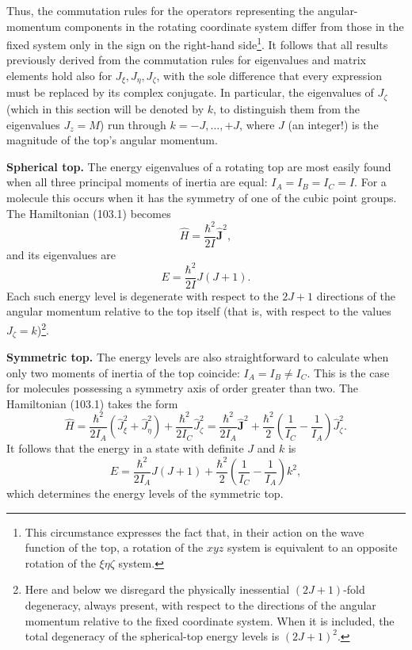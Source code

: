 Thus, the commutation rules for the operators representing the angular-momentum components in the rotating coordinate system differ from those in the fixed system only in the sign on the right-hand side\footnote{This circumstance expresses the fact that, in their action on the wave function of the top, a rotation of the $xyz$ system is equivalent to an opposite rotation of the $\xi\eta\zeta$ system.}. It follows that all results previously derived from the commutation rules for eigenvalues and matrix elements hold also for $J_\xi,J_\eta,J_\zeta$, with the sole difference that every expression must be replaced by its complex conjugate. In particular, the eigenvalues of $J_\zeta$ (which in this section will be denoted by $k$, to distinguish them from the eigenvalues $J_z=M$) run through $k=-J,\ldots,+J$, where $J$ (an integer!) is the magnitude of the top's angular momentum.

\textbf{Spherical top.} The energy eigenvalues of a rotating top are most easily found when all three principal moments of inertia are equal: $I_A=I_B=I_C=I$. For a molecule this occurs when it has the symmetry of one of the cubic point groups. The Hamiltonian (103.1) becomes
\[
 \hat H=\frac{\hbar^2}{2I}\hat{\mathbf J}^{2},
\]
and its eigenvalues are
\begin{equation}
 E=\frac{\hbar^2}{2I}J(J+1). \tag{103.4}
\end{equation}
Each such energy level is degenerate with respect to the $2J+1$ directions of the angular momentum relative to the top itself (that is, with respect to the values $J_\zeta=k$)\footnote{Here and below we disregard the physically inessential $(2J+1)$-fold degeneracy, always present, with respect to the directions of the angular momentum relative to the fixed coordinate system. When it is included, the total degeneracy of the spherical-top energy levels is $(2J+1)^2$.}.

\textbf{Symmetric top.} The energy levels are also straightforward to calculate when only two moments of inertia of the top coincide: $I_A=I_B\ne I_C$. This is the case for molecules possessing a symmetry axis of order greater than two. The Hamiltonian (103.1) takes the form
\begin{equation}
 \hat H=\frac{\hbar^2}{2I_A}(\hat J_\xi^2+\hat J_\eta^2)+\frac{\hbar^2}{2I_C}\hat J_\zeta^2
 =\frac{\hbar^2}{2I_A}\hat{\mathbf J}^{2}+\frac{\hbar^2}{2}\left(\frac1{I_C}-\frac1{I_A}\right)\hat J_\zeta^2. \tag{103.5}
\end{equation}
It follows that the energy in a state with definite $J$ and $k$ is
\begin{equation}
 E=\frac{\hbar^2}{2I_A}J(J+1)+\frac{\hbar^2}{2}\left(\frac1{I_C}-\frac1{I_A}\right)k^2, \tag{103.6}
\end{equation}
which determines the energy levels of the symmetric top.

